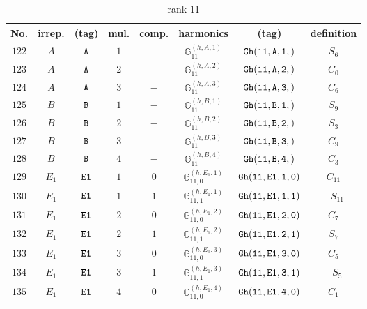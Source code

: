\documentclass[fleqn,8pt]{jsarticle}
\begin{document}
\begin{table}[ht!]
\begin{center}
\caption{rank 11}
\renewcommand{\arraystretch}{1.3}
\begin{tabular}{cccccccc} \hline \hline
No. & irrep. & (tag) & mul. & comp. & harmonics & (tag) & definition \\ \hline
$ 122 $ & $ A $ & $ {\tt A} $ & $ 1 $ & $ - $ & $ \mathbb{G}_{11}^{(h,A,1)} $ & $ {\tt Gh(11,A,1,)} $ & $ S_{6} $ \\
$ 123 $ & $ A $ & $ {\tt A} $ & $ 2 $ & $ - $ & $ \mathbb{G}_{11}^{(h,A,2)} $ & $ {\tt Gh(11,A,2,)} $ & $ C_{0} $ \\
$ 124 $ & $ A $ & $ {\tt A} $ & $ 3 $ & $ - $ & $ \mathbb{G}_{11}^{(h,A,3)} $ & $ {\tt Gh(11,A,3,)} $ & $ C_{6} $ \\
$ 125 $ & $ B $ & $ {\tt B} $ & $ 1 $ & $ - $ & $ \mathbb{G}_{11}^{(h,B,1)} $ & $ {\tt Gh(11,B,1,)} $ & $ S_{9} $ \\
$ 126 $ & $ B $ & $ {\tt B} $ & $ 2 $ & $ - $ & $ \mathbb{G}_{11}^{(h,B,2)} $ & $ {\tt Gh(11,B,2,)} $ & $ S_{3} $ \\
$ 127 $ & $ B $ & $ {\tt B} $ & $ 3 $ & $ - $ & $ \mathbb{G}_{11}^{(h,B,3)} $ & $ {\tt Gh(11,B,3,)} $ & $ C_{9} $ \\
$ 128 $ & $ B $ & $ {\tt B} $ & $ 4 $ & $ - $ & $ \mathbb{G}_{11}^{(h,B,4)} $ & $ {\tt Gh(11,B,4,)} $ & $ C_{3} $ \\
$ 129 $ & $ E_{1} $ & $ {\tt E1} $ & $ 1 $ & $ 0 $ & $ \mathbb{G}_{11,0}^{(h,E_{1},1)} $ & $ {\tt Gh(11,E1,1,0)} $ & $ C_{11} $ \\
$ 130 $ & $ E_{1} $ & $ {\tt E1} $ & $ 1 $ & $ 1 $ & $ \mathbb{G}_{11,1}^{(h,E_{1},1)} $ & $ {\tt Gh(11,E1,1,1)} $ & $ - S_{11} $ \\
$ 131 $ & $ E_{1} $ & $ {\tt E1} $ & $ 2 $ & $ 0 $ & $ \mathbb{G}_{11,0}^{(h,E_{1},2)} $ & $ {\tt Gh(11,E1,2,0)} $ & $ C_{7} $ \\
$ 132 $ & $ E_{1} $ & $ {\tt E1} $ & $ 2 $ & $ 1 $ & $ \mathbb{G}_{11,1}^{(h,E_{1},2)} $ & $ {\tt Gh(11,E1,2,1)} $ & $ S_{7} $ \\
$ 133 $ & $ E_{1} $ & $ {\tt E1} $ & $ 3 $ & $ 0 $ & $ \mathbb{G}_{11,0}^{(h,E_{1},3)} $ & $ {\tt Gh(11,E1,3,0)} $ & $ C_{5} $ \\
$ 134 $ & $ E_{1} $ & $ {\tt E1} $ & $ 3 $ & $ 1 $ & $ \mathbb{G}_{11,1}^{(h,E_{1},3)} $ & $ {\tt Gh(11,E1,3,1)} $ & $ - S_{5} $ \\
$ 135 $ & $ E_{1} $ & $ {\tt E1} $ & $ 4 $ & $ 0 $ & $ \mathbb{G}_{11,0}^{(h,E_{1},4)} $ & $ {\tt Gh(11,E1,4,0)} $ & $ C_{1} $ \\

\end{tabular}
\end{center}
\end{table}
\end{document}
